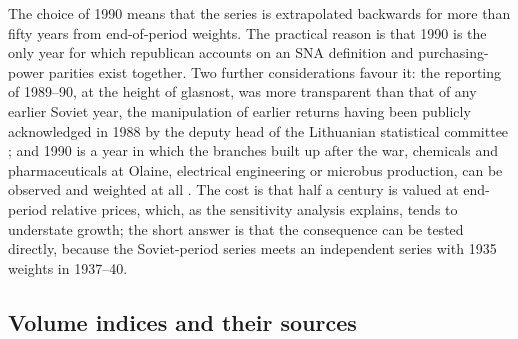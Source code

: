 The choice of 1990 means that the series is extrapolated backwards for more than fifty years from end-of-period weights. The practical reason is that 1990 is the only year for which republican accounts on an SNA definition and purchasing-power parities exist together. Two further considerations favour it: the reporting of 1989--90, at the height of glasnost, was more transparent than that of any earlier Soviet year, the manipulation of earlier returns having been publicly acknowledged in 1988 by the deputy head of the Lithuanian statistical committee \parencite{adlys1988}; and 1990 is a year in which the branches built up after the war, chemicals and pharmaceuticals at Olaine, electrical engineering or microbus production, can be observed and weighted at all \parencites[278]{krumins_2017_tautsaimnieciba_1950}[303, 305]{krumins_2017_tautsaimnieciba_1960}. The cost is that half a century is valued at end-period relative prices, which, as the sensitivity analysis explains, tends to understate growth; the short answer is that the consequence can be tested directly, because the Soviet-period series meets an independent series with 1935 weights in 1937--40.

\subsection{Volume indices and their sources}

